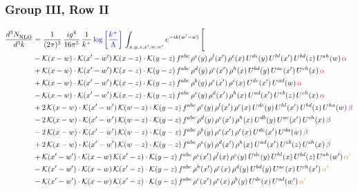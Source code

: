 \documentclass[9pt]{article}
\numberwithin{equation}{section}
\begin{document}
\subsubsection{Group III, Row II}
\begin{align}
     \frac{d^{3}N_{\rm NLO}^{\rm}}{d^{3}k}  & = \frac{1}{(2\pi)^{3}}\, \frac{ig^{4}}{16\pi^{5}}\, \frac{1}{k^{+}}\, {\color{blue}\log{\left[\frac{k^{+}}{\Lambda}\right]}}\,\int_{x,y,z,x^{\prime},w,w^{\prime}}e^{-ik(w^{\prime}-w)}\, \Bigg[\notag \\ & -\mathcal{K}(x-w)\cdot \mathcal{K}(x'-w')\, \mathcal{K}(x-z)\cdot \mathcal{K}(y-z)\, f^{abc}\, \rho^{e}(y)\,\rho^{l}(x')\,\rho^{c}(x)\,U^{de}(y)\,U^{hl}(x')\,U^{bd}(z)\,U^{ah}(w)\, {\color{red}\alpha} \notag \\ & +\mathcal{K}(x-w)\cdot \mathcal{K}(x'-w')\, \mathcal{K}(x-z)\cdot \mathcal{K}(y-z)\, f^{abc}\, \rho^{d}(y)\,\rho^{e}(x')\,\rho^{h}(x)\,U^{bd}(y)\,U^{ae}(x')\,U^{ch}(x)\, {\color{red}\alpha} \notag \\ & + \mathcal{K}(x-w)\cdot \mathcal{K}(x'-w')\, \mathcal{K}(x-z)\cdot \mathcal{K}(y-z)\, f^{abc}\, \rho^{b}(y)\,\rho^{e}(x')\,\rho^{c}(x)\,U^{de}(x')\,U^{ad}(w)\, {\color{red}\alpha} \notag \\ & -\mathcal{K}(x-w)\cdot \mathcal{K}(x'-w')\, \mathcal{K}(x-z)\cdot \mathcal{K}(y-z)\, f^{abc}\, \rho^{e}(y)\,\rho^{d}(x')\,\rho^{h}(x)\,U^{ad}(x')\,U^{eb}(z)\,U^{ch}(x)\, {\color{red}\alpha} \notag \\ & +2\, \mathcal{K}(x-w)\cdot \mathcal{K}(x'-w')\, \mathcal{K}(w-z) \cdot \mathcal{K}(y-z)\, f^{abc}\, \rho^{e}(y)\,\rho^{l}(x')\, \rho^{c}(x)\, U^{de}(y)\,U^{hl}(x')\,U^{bd}(z)\,U^{ha}(w)\, {\color{violet} \beta} \notag \\ & -2\, \mathcal{K}(x-w)\cdot \mathcal{K}(x'-w')\, \mathcal{K}(w-z) \cdot \mathcal{K}(y-z)\, f^{abc}\, \rho^{d}(y)\,\rho^{e}(x')\, \rho^{h}(x)\, U^{db}(y)\,U^{ae}(x')\,U^{ch}(x)\, {\color{violet} \beta}\notag \\ & -2\, \mathcal{K}(x-w)\cdot \mathcal{K}(x'-w')\, \mathcal{K}(w-z) \cdot \mathcal{K}(y-z)\, f^{abc}\, \rho^{b}(y)\,\rho^{e}(x')\, \rho^{c}(x)\, U^{de}(x')\,U^{da}(w)\, {\color{violet} \beta}\notag \\ & + 2\, \mathcal{K}(x-w)\cdot \mathcal{K}(x'-w')\, \mathcal{K}(w-z) \cdot \mathcal{K}(y-z)\, f^{abc}\, \rho^{e}(y)\,\rho^{d}(x')\, \rho^{h}(x)\, U^{ad}(x')\,U^{eb}(z)\,U^{ch}(x)\, {\color{violet} \beta}\notag \\ & +\mathcal{K}(x'-w')\cdot\mathcal{K}(x-w)\,\mathcal{K}(x'-z)\cdot\mathcal{K}(y-z)\, f^{abc}\,\rho^{c}(x')\,\rho^{l}(x)\,\rho^{e}(y)\,U^{de}(y)\,U^{hl}(x)\,U^{bd}(z)\,U^{ah}(w')\,{\color{orange} \alpha'}\notag\\ & -\mathcal{K}(x'-w')\cdot\mathcal{K}(x-w)\,\mathcal{K}(x'-z)\cdot\mathcal{K}(y-z)\, f^{abc}\,\rho^{h}(x')\,\rho^{e}(x)\,\rho^{d}(y)\,U^{bd}(y)\,U^{ae}(x)\,U^{ch}(x')\,{\color{orange} \alpha'}\notag\\ &-\mathcal{K}(x'-w')\cdot\mathcal{K}(x-w)\,\mathcal{K}(x'-z)\cdot\mathcal{K}(y-z)\, f^{abc}\,\rho^{c}(x')\,\rho^{e}(x)\,\rho^{b}(y)\,U^{de}(x)\,U^{ad}(w')\,{\color{orange} \alpha'}\notag\\ & 
\end{align}
\end{document}
